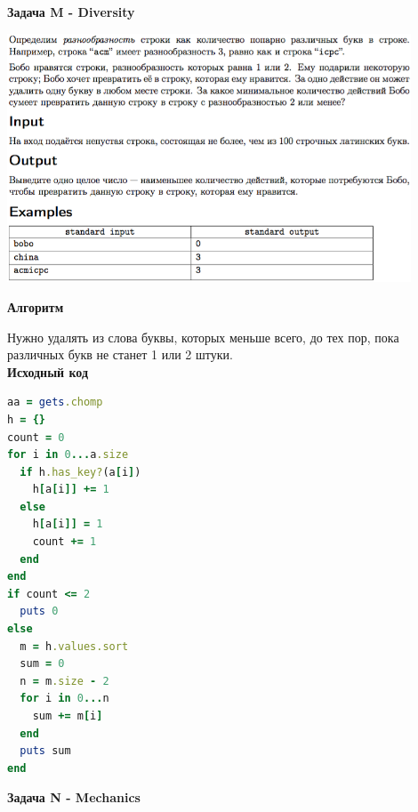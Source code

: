 \documentclass[a4paper,12pt]{article}
\begin{document}
\newpage
\textbf{{\large Задача M - Diversity}}

\begin{center}
\includegraphics[width=0.9\textwidth]{OC_China_2016/M.png}\\ [1cm]
\end{center}

\textbf{{\large Алгоритм}}

Нужно удалять из слова буквы, которых меньше всего, до тех пор, пока различных букв не станет 1 или 2 штуки. \\

\textbf{{\large Исходный код}} \\
\begin{lstlisting}[language=Ruby]
aa = gets.chomp
h = {}
count = 0
for i in 0...a.size
  if h.has_key?(a[i])
    h[a[i]] += 1
  else
    h[a[i]] = 1
    count += 1
  end
end
if count <= 2
  puts 0
else
  m = h.values.sort
  sum = 0
  n = m.size - 2
  for i in 0...n
    sum += m[i]
  end
  puts sum
end
\end{lstlisting}


\newpage
\textbf{{\large Задача N - Mechanics}}
\end{document}
